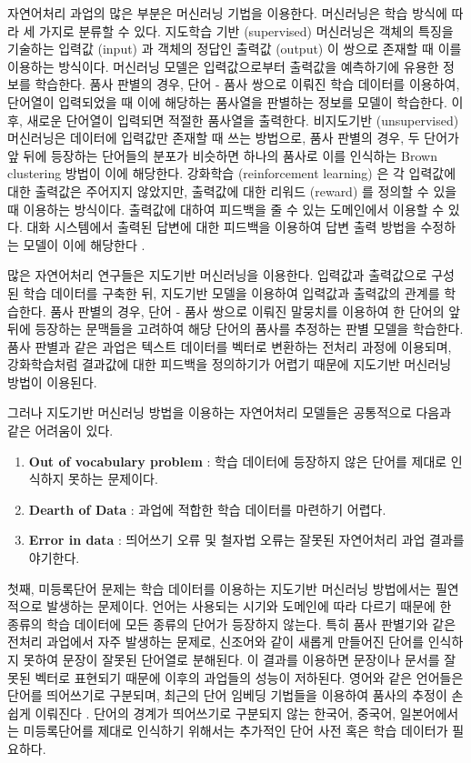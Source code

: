 \documentclass[11pt]{article}
\begin{document}
자연어처리 과업의 많은 부분은 머신러닝 기법을 이용한다.
머신러닝은 학습 방식에 따라 세 가지로 분류할 수 있다.
지도학습 기반 (supervised) 머신러닝은 객체의 특징을 기술하는 입력값 (input) 과 객체의 정답인 출력값 (output) 이 쌍으로 존재할 때 이를 이용하는 방식이다.
머신러닝 모델은 입력값으로부터 출력값을 예측하기에 유용한 정보를 학습한다.
품사 판별의 경우, 단어 - 품사 쌍으로 이뤄진 학습 데이터를 이용하여, 단어열이 입력되었을 때 이에 해당하는 품사열을 판별하는 정보를 모델이 학습한다.
이후, 새로운 단어열이 입력되면 적절한 품사열을 출력한다.
비지도기반 (unsupervised) 머신러닝은 데이터에 입력값만 존재할 때 쓰는 방법으로, 품사 판별의 경우, 두 단어가 앞 뒤에 등장하는 단어들의 분포가 비슷하면 하나의 품사로 이를 인식하는 Brown clustering \citep{brown1992class} 방법이 이에 해당한다.
강화학습 (reinforcement learning) 은 각 입력값에 대한 출력값은 주어지지 않았지만, 출력값에 대한 리워드 (reward) 를 정의할 수 있을 때 이용하는 방식이다.
출력값에 대하여 피드백을 줄 수 있는 도메인에서 이용할 수 있다.
대화 시스템에서 출력된 답변에 대한 피드백을 이용하여 답변 출력 방법을 수정하는 모델이 이에 해당한다 \citep{mo2018personalizing, singh2000reinforcement, li2016deep}. 

많은 자연어처리 연구들은 지도기반 머신러닝을 이용한다.
입력값과 출력값으로 구성된 학습 데이터를 구축한 뒤, 지도기반 모델을 이용하여 입력값과 출력값의 관계를 학습한다.
품사 판별의 경우, 단어 - 품사 쌍으로 이뤄진 말뭉치를 이용하여 한 단어의 앞 뒤에 등장하는 문맥들을 고려하여 해당 단어의 품사를 추정하는 판별 모델을 학습한다.
품사 판별과 같은 과업은 텍스트 데이터를 벡터로 변환하는 전처리 과정에 이용되며, 강화학습처럼 결과값에 대한 피드백을 정의하기가 어렵기 때문에 지도기반 머신러닝 방법이 이용된다.

그러나 지도기반 머신러닝 방법을 이용하는 자연어처리 모델들은 공통적으로 다음과 같은 어려움이 있다.

\begin{enumerate}[noitemsep]
    \item \textbf{Out of vocabulary problem} : 학습 데이터에 등장하지 않은 단어를 제대로 인식하지 못하는 문제이다.
    \item \textbf{Dearth of Data} : 과업에 적합한 학습 데이터를 마련하기 어렵다.
    \item \textbf{Error in data} : 띄어쓰기 오류 및 철자법 오류는 잘못된 자연어처리 과업 결과를 야기한다.
\end{enumerate}

첫째, 미등록단어 문제는 학습 데이터를 이용하는 지도기반 머신러닝 방법에서는 필연적으로 발생하는 문제이다.
언어는 사용되는 시기와 도메인에 따라 다르기 때문에 한 종류의 학습 데이터에 모든 종류의 단어가 등장하지 않는다.
특히 품사 판별기와 같은 전처리 과업에서 자주 발생하는 문제로, 신조어와 같이 새롭게 만들어진 단어를 인식하지 못하여 문장이 잘못된 단어열로 분해된다.
이 결과를 이용하면 문장이나 문서를 잘못된 벡터로 표현되기 때문에 이후의 과업들의 성능이 저하된다.
영어와 같은 언어들은 단어를 띄어쓰기로 구분되며, 최근의 단어 임베딩 기법들을 이용하여 품사의 추정이 손쉽게 이뤄진다 \citep{turian2010word, mikolov2013efficient, collobert2011natural}.
단어의 경계가 띄어쓰기로 구분되지 않는 한국어, 중국어, 일본어에서는 미등록단어를 제대로 인식하기 위해서는 추가적인 단어 사전 혹은 학습 데이터가 필요하다.
\end{document}
